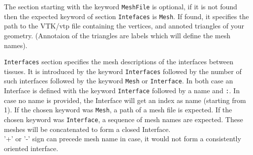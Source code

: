 \documentclass[10pt,journal]{book}
\begin{document}
    \medskip
    The section starting with the keyword {\tt MeshFile} is optional, if it is not found then the expected keyword of section {\tt Intefaces} is {\tt Mesh}. If found, it specifies the path to the VTK/vtp file containing the vertices, and annoted triangles of your geometry. (Annotaion of the triangles are labels which will define the mesh names).

    \medskip

    {\tt Interfaces} section specifies the mesh descriptions of the interfaces between tissues. It is introduced by the keyword {\tt Interfaces} followed
    by the number of such interfaces followed by the keyword {\tt Mesh} or {\tt Interface}.
    In both case an Interface is defined with the keyword {\tt Interface} followed by a name and {\tt :}.
    In case no name is provided, the Interface will get an index as name (starting from 1).
    If the chosen keyword was {\tt Mesh}, a path of a mesh file is expected.
    If the chosen keyword was {\tt Interface}, a sequence of mesh names are expected.
    These meshes will be concatenated to form a closed Interface. \\
    '+' or '-' sign can precede mesh name in case, it would not form a consistently oriented interface.

    \medskip
\end{document}
